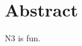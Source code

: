 \chapter{Abstract}
\setlength{\epigraphrule}{0pt}
\setlength{\epigraphwidth}{0.48\textwidth}

N3 is fun.


